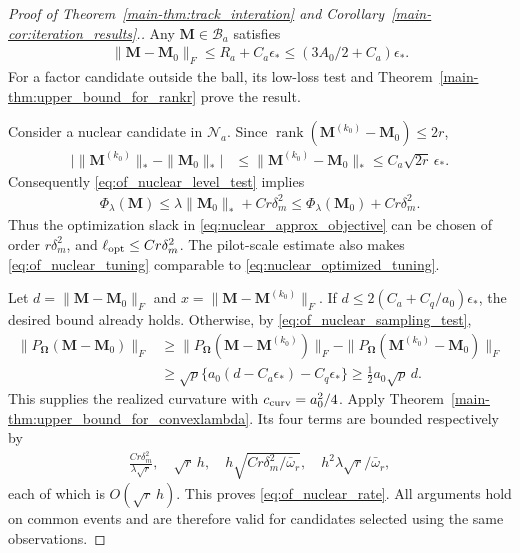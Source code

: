 \documentclass[numsec,webpdf,modern,large,namedate]{oup-authoring-template}
\theoremstyle{plain}
\theoremstyle{remark}
\newcommand{\M}{\bm{M}}
\newcommand{\bOmega}{\bm{\Omega}}
\newif\ifmarkchanges
\newenvironment{revision}{\begingroup\ifmarkchanges\color{red}\fi}{\endgroup}
\begin{document}
\begin{revision}
\begin{proof}[Proof of Theorem~\ref{main-thm:track_interation} and Corollary~\ref{main-cor:iteration_results}.]
Any $\M\in\mathcal B_a$ satisfies
\begin{align*}
 \|\M-\M_0\|_F\le R_a+C_a\epsilon_*
       \le(3A_0/2+C_a)\epsilon_*.
\end{align*}
For a factor candidate outside the ball, its low-loss test and
Theorem~\ref{main-thm:upper_bound_for_rankr} prove the result.

Consider a nuclear candidate in $\mathcal N_a$.  Since
$\operatorname{rank}(\M^{(k_0)}-\M_0)\le2r$,
\begin{align*}
 \big|\|\M^{(k_0)}\|_*-\|\M_0\|_*\big|
 &\le\|\M^{(k_0)}-\M_0\|_*\le C_a\sqrt{2r}\,\epsilon_*.
\end{align*}
Consequently \eqref{eq:of_nuclear_level_test} implies
\begin{align*}
 \Phi_\lambda(\M)
 \le\lambda\|\M_0\|_*+C r\delta_m^2
 \le\Phi_\lambda(\M_0)+C r\delta_m^2.
\end{align*}
Thus the optimization slack in
\eqref{eq:nuclear_approx_objective} can be chosen of order
$r\delta_m^2$, and $\ell_{\rm opt}\le C r\delta_m^2$.
The pilot-scale estimate also makes \eqref{eq:of_nuclear_tuning}
comparable to \eqref{eq:nuclear_optimized_tuning}.

Let $d=\|\M-\M_0\|_F$ and $x=\|\M-\M^{(k_0)}\|_F$.
If $d\le2(C_a+C_q/a_0)\epsilon_*$, the desired bound already holds.
Otherwise, by \eqref{eq:of_nuclear_sampling_test},
\begin{align*}
 \|P_{\bOmega}(\M-\M_0)\|_F
 &\ge\|P_{\bOmega}(\M-\M^{(k_0)})\|_F
       -\|P_{\bOmega}(\M^{(k_0)}-\M_0)\|_F\\
 &\ge\sqrt p\{a_0(d-C_a\epsilon_*)-C_q\epsilon_*\}
 \ge\tfrac12a_0\sqrt p\,d.
\end{align*}
This supplies the realized curvature with
$c_{\rm curv}=a_0^2/4$.  Apply
Theorem~\ref{main-thm:upper_bound_for_convexlambda}.  Its four terms are
bounded respectively by
\begin{align*}
 \frac{Cr\delta_m^2}{\lambda\sqrt r},\quad
 \sqrt r\,h,\quad
 h\sqrt{Cr\delta_m^2/\bar\omega_r},\quad
 h^2\lambda\sqrt r/\bar\omega_r,
\end{align*}
each of which is $O(\sqrt r\,h)$.  This proves
\eqref{eq:of_nuclear_rate}.  All arguments hold on common events and are
therefore valid for candidates selected using the same observations.


\end{proof}
\end{revision}
\end{document}
